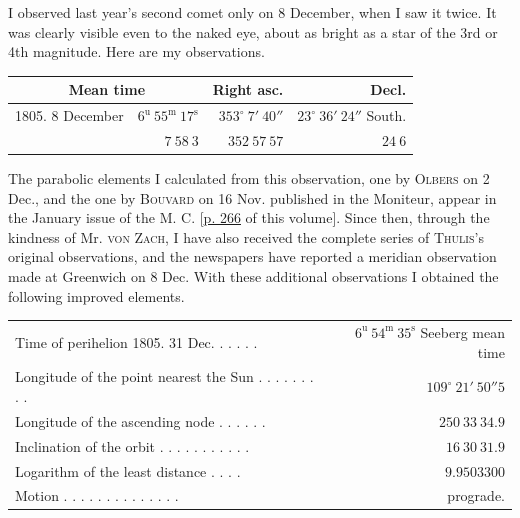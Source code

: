 
\par\indent I observed last year’s second comet only on 8 December, when I saw it twice. It was clearly visible even to the naked eye, about as bright as a star of the 3rd or 4th magnitude. Here are my observations.
\begin{center}
\begingroup\fontsize{9}{11}\selectfont\setlength{\tabcolsep}{2pt}\renewcommand{\arraystretch}{1.1}
\begin{tabular}{lr|r|r}
\multicolumn{2}{c|}{Mean time} & Right asc. & Decl.\\ \hline
1805. 8 December & $6^{\mathrm u}\ 55^{\mathrm m}\ 17^{\mathrm s}$ & $353^\circ\ 7'\ 40''$ & $23^\circ\ 36'\ 24''$ South.\\
& $7\ 58\ 3$ & $352\ 57\ 57$ & $24\ 6$\\
\end{tabular}\endgroup
\end{center}

\par\indent The parabolic elements I calculated from this observation, one by \textsc{Olbers} on 2 Dec., and the one by \textsc{Bouvard} on 16 Nov. published in the Moniteur, appear in the January issue of the M. C. [\hyperlink{comet1805-2.1}{p. 266} of this volume]. Since then, through the kindness of Mr. \textsc{von Zach}, I have also received the complete series of \textsc{Thulis}’s original observations, and the newspapers have reported a meridian observation made at Greenwich on 8 Dec. With these additional observations I obtained the following improved elements.

\begin{center}
\begingroup\fontsize{8}{10}\selectfont\setlength{\tabcolsep}{2pt}\renewcommand{\arraystretch}{1.1}
\begin{tabular}{lr}
Time of perihelion 1805. 31 Dec. . . . . . & $6^{\mathrm u}\ 54^{\mathrm m}\ 35^{\mathrm s}$ Seeberg mean time\\
Longitude of the point nearest the Sun . . . . . . . . . & $109^\circ\ 21'\ 50''5$\\
Longitude of the ascending node . . . . . . & $250\ 33\ 34.9$\\
Inclination of the orbit . . . . . . . . . . . & $16\ 30\ 31.9$\\
Logarithm of the least distance . . . . & $9.9503300$\\
Motion . . . . . . . . . . . . . . & prograde.\\
\end{tabular}\endgroup
\end{center}

